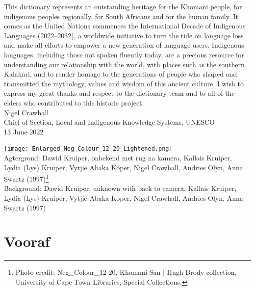 This dictionary represents an outstanding heritage for the
\textipa{\textdoublebarpipe}Khomani people, for indigenous peoples
regionally, for South Africans and for the human family. It comes as
the United Nations commences the International Decade of Indigenous
Languages (2022--2032), a worldwide initiative to turn the tide on
language loss and make all efforts to empower a new generation of
language users. Indigenous languages, including those not spoken
fluently today, are a precious resource for understanding our
relationship with the world, with places such as the southern
Kalahari, and to render homage to the generations of people who shaped
and transmitted the mythology, values and wisdom of this ancient
culture. I wish to express my great thanks and respect to the
dictionary team and to all of the elders who contributed to this
historic project.\\

Nigel Crawhall\\[1em]

Chief of Section, Local and Indigenous Knowledge Systems,
UNESCO\\[1em]

13 June 2022

\vfill
\begin{center}
    \texttt{[image: Enlarged\_Neg\_Colour\_12-20\_Lightened.png]}\\
    Agtergrond: Dawid Kruiper, onbekend met rug na kamera, Kallais
    Kruiper, Lydia (Lys) Kruiper, Vytjie \textipa{\textvertline}Abaka
    Koper, Nigel Crawhall, Andries Olyn, Anna Swartz
    (1997)\footnote{\label{nc}Photo credit: Neg\_Colour\_12-20,
    \textipa{\textdoublebarpipe}Khomani San $|$ Hugh Brody collection, University of Cape Town
    Libraries, Special Collections.}\\
Background: Dawid Kruiper, unknown with back to camera, Kallais
    Kruiper, Lydia (Lys) Kruiper, Vytjie \textipa{\textvertline}Abaka
    Koper, Nigel Crawhall, Andries Olyn, Anna Swartz
    (1997)
\end{center}


\newpage


\markboth{}{}
\section{Vooraf}
\markboth{}{}

